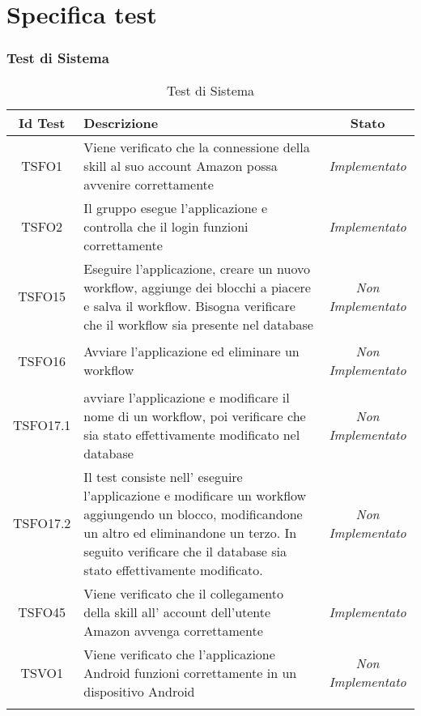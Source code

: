 \chapter{Specifica test}
\label{test}
\subsection{Test di Sistema}
\normalsize
\begin{longtable}{|c|>{}m{8cm}|c|}
\hline 
\textbf{Id Test} & \textbf{Descrizione} & \textbf{Stato}\\
\hline
\endhead
\hypertarget{TSFO1}{TSFO1} & Viene verificato che la connessione della skill al suo account Amazon possa avvenire correttamente & \textit{Implementato}\\ \hline
\hypertarget{TSFO2}{TSFO2} & Il gruppo esegue l'applicazione e controlla che il login funzioni correttamente & \textit{Implementato}\\ \hline
\hypertarget{TSFO15}{TSFO15} & Eseguire l'applicazione, creare un nuovo workflow, aggiunge dei blocchi a piacere e salva il workflow. Bisogna verificare che il workflow sia presente nel database & \textit{Non Implementato}\\ \hline
\hypertarget{TSFO16}{TSFO16} & Avviare l'applicazione ed eliminare un workflow & \textit{Non Implementato}\\ \hline
\hypertarget{TSFO17.1}{TSFO17.1} & avviare l'applicazione e modificare il nome di un workflow, poi verificare che sia stato effettivamente modificato nel database & \textit{Non Implementato}\\ \hline
\hypertarget{TSFO17.2}{TSFO17.2} & Il test consiste nell' eseguire l'applicazione e modificare un workflow aggiungendo un blocco, modificandone un altro ed eliminandone un terzo. In seguito verificare che il database sia stato effettivamente modificato. & \textit{Non Implementato}\\ \hline
\hypertarget{TSFO45}{TSFO45} & Viene verificato che il collegamento della skill all' account dell'utente Amazon avvenga correttamente & \textit{Implementato}\\ \hline
\hypertarget{TSVO1}{TSVO1} & Viene verificato che l'applicazione Android funzioni correttamente in un dispositivo Android & \textit{Non Implementato}\\ \hline
\caption[Test di Sistema]{Test di Sistema}
\label{tabella:test1}
\end{longtable}
\clearpage

